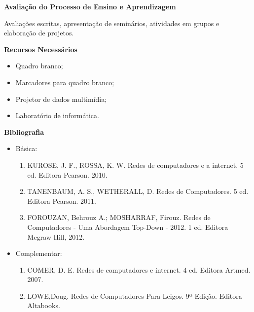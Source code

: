 \begin{snugshade}\begin{center}\textbf{
    Avaliação do Processo de Ensino e Aprendizagem
}\end{center}\end{snugshade}

\noindent
  Avaliações escritas, apresentação de seminários, atividades em grupos e elaboração de projetos.
   
\begin{snugshade}\begin{center}\textbf{
    Recursos Necessários
    \vphantom{q} %
}\end{center}\end{snugshade}

\begin{itemize} 
	\item Quadro branco;
	\item Marcadores para quadro branco;
	\item Projetor de dados multimídia;
	\item Laboratório de informática.
\end{itemize}


\begin{snugshade}\begin{center}\textbf{
    Bibliografia
}\end{center}\end{snugshade}

\begin{itemize} 
  \item Básica:
	\begin{enumerate}
	\item KUROSE, J. F., ROSSA, K. W. Redes de computadores e a internet. 5 ed. Editora Pearson. 2010.
	\item TANENBAUM, A. S., WETHERALL, D. Redes de Computadores. 5 ed. Editora Pearson. 2011. 
	\item FOROUZAN, Behrouz A.; MOSHARRAF, Firouz. Redes de Computadores - Uma Abordagem Top-Down - 2012. 1 ed. Editora Mcgraw Hill, 2012.	
	\end{enumerate}
  \item Complementar:
	\begin{enumerate} 
	\item COMER, D. E. Redes de computadores e internet. 4 ed. Editora Artmed. 2007.
	\item LOWE,Doug. Redes de Computadores Para Leigos. 9ª Edição. Editora Altabooks.
	\end{enumerate}
\end{itemize}

